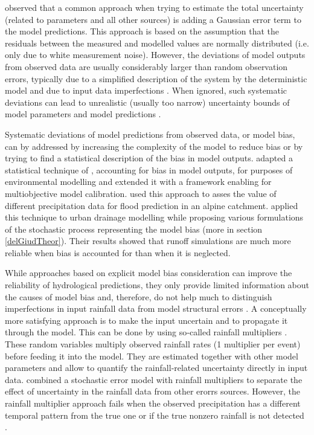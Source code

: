 \documentclass{ctuthesis}\usepackage[]{graphicx}\usepackage[]{color}
\begin{document}
\cite{dotto2012comparison} observed that a common approach when trying to estimate the total uncertainty (related to parameters and all other sources) is adding a Gaussian error term to the model predictions. This approach is based on the assumption that the residuals between the measured and modelled values are normally distributed (i.e. only due to white measurement noise). However, the deviations of model outputs from observed data are usually considerably larger than random observation errors, typically due to a simplified description of the system by the deterministic model and due to input data imperfections \citep{reichert2012linking}. When ignored, such systematic deviations can lead to unrealistic (usually too narrow) uncertainty bounds of model parameters and model predictions \citep{reichert2012linking}.

Systematic deviations of model predictions from observed data, or model bias, can by addressed by increasing the complexity of the model to reduce bias or by trying to find a statistical description of the bias in model outputs. \cite{reichert2012linking} adapted a statistical technique of \cite{kennedy2001bayesian}, accounting for bias in model outputs, for purposes of environmental modelling and extended it with a framework enabling for multiobjective model calibration. \cite{sikorskaValueDifferentPrecipitation2018} used this approach to asses the value of different precipitation data for flood prediction in an alpine catchment. \cite{giudice2013improving} applied this technique to urban drainage modelling while proposing various formulations of the stochastic process representing the model bias (more in section \ref{delGiudTheor}). Their results showed that runoff simulations are much more reliable when bias is accounted for than when it is neglected. 

While approaches based on explicit model bias consideration can improve the reliability of hydrological predictions, they only provide limited information about the causes of model bias and, therefore, do not help much to distinguish imperfections in input rainfall data from model structural errors \citep{giudice2013improving}. A conceptually more satisfying approach is to make the input uncertain and to propagate it through the model. This can be done by using so‐called rainfall multipliers \citep{kavetskiBayesianAnalysisInput2006, vrugtTreatmentInputUncertainty2008}. These random variables multiply observed rainfall rates (1 multiplier per event) before feeding it into the model. They are estimated together with other model parameters and allow to quantify the rainfall‐related uncertainty directly in input data. \cite{sikorskaBayesianUncertaintyAssessment2012} combined a stochastic error model with rainfall multipliers to separate the effect of uncertainty in the rainfall data from other erorrs sources. However, the rainfall multiplier approach fails when the observed precipitation has a different temporal pattern from the true one or if the true nonzero rainfall is not detected \citep{delgiudiceDescribingCatchmentaveragedPrecipitation2016}. 
\end{document}
